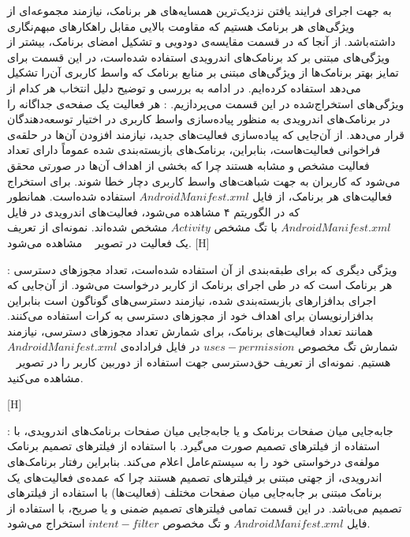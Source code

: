 به جهت اجرای فرایند یافتن نزدیک‌ترین همسایه‌های هر برنامک، نیازمند مجموعه‌ای از ویژگی‌های هر برنامک هستیم که مقاومت بالایی مقابل راهکار‌های مبهم‌نگاری داشته‌باشد. از آنجا که در قسمت مقایسه‌ی دودویی و تشکیل امضای برنامک‌، بیشتر از ویژگی‌های مبتنی بر کد برنامک‌های اندرویدی استفاده شده‌است، در این قسمت برای تمایز بهتر برنامک‌ها از ویژگی‌های مبتنی بر منابع برنامک که واسط کاربری آن‌را تشکیل می‌دهد استفاده کرده‌ایم. در ادامه به بررسی و توضیح دلیل انتخاب هر کدام از ویژگی‌های استخراج‌شده در این قسمت می‌پردازیم.
: هر فعالیت یک صفحه‌ی جداگانه را در برنامک‌های اندرویدی به منظور پیاده‌سازی واسط‌ کاربری در اختیار توسعه‌دهندگان قرار می‌دهد. از آن‌جایی که پیاده‌سازی فعالیت‌های جدید، نیازمند افزودن آن‌ها در حلقه‌ی فراخوانی فعالیت‌هاست، بنابر‌این، برنامک‌های بازبسته‌بندی شده عموماً دارای تعداد فعالیت مشخص و مشابه هستند چرا که بخشی از اهداف آن‌ها در صورتی محقق می‌شود که کاربران به جهت شباهت‌های واسط کاربری دچار خطا شوند. برای استخراج فعالیت‌های هر برنامک، از فایل $AndroidManifest.xml$ استفاده شده‌است. همانطور که در الگوریتم ۴ مشاهده می‌شود، فعالیت‌های اندرویدی در فایل $AndroidManifest.xml$ با تگ مشخص $Activity$ مشخص شده‌اند. نمونه‌ای از تعریف   یک فعالیت در تصویر ~ مشاهده می‌شود.
[H]
\vspace{1em}


: ویژگی دیگری که برای طبقه‌بندی از آن استفاده شده‌است، تعداد مجوز‌های دسترسی هر برنامک است که در طی اجرای برنامک از کاربر درخواست می‌شود. از آن‌جایی که اجرای بدافزار‌های بازبسته‌بندی شده، نیازمند دسترسی‌های گوناگون‌ است بنابراین بدافزارنویسان برای اهداف خود از مجوز‌های دسترسی به کرات استفاده می‌کنند. همانند تعداد‌ فعالیت‌های برنامک، برای شمارش تعداد مجوز‌های دسترسی، نیازمند شمارش تگ مخصوص $uses-permission$ در فایل فراداده‌ی $AndroidManifest.xml$ هستیم. نمونه‌ای از تعریف حق‌دسترسی جهت استفاده از دوربین کاربر را در تصویر ~ مشاهده می‌کنید.


[H]
\vspace{1em}

: جابه‌جایی میان صفحات برنامک و یا جابه‌جایی میان صفحات برنامک‌های اندرویدی، با استفاده از فیلتر‌های تصمیم صورت می‌گیرد. با استفاده از فیلتر‌های تصمیم برنامک مولفه‌ی درخواستی خود را به سیستم‌عامل اعلام می‌کند. بنابراین رفتار برنامک‌های اندرویدی، از جهتی مبتنی بر فیلتر‌های تصمیم هستند چرا که عمده‌ی فعالیت‌های یک برنامک مبتنی بر جابه‌جایی میان صفحات مختلف (فعالیت‌ها) با استفاده از فیلتر‌های تصمیم می‌باشد. در این قسمت تمامی فیلتر‌های تصمیم ضمنی و یا صریح، با استفاده از فایل $AndroidManifest.xml$ و تگ مخصوص $intent-filter$ استخراج می‌شود.

